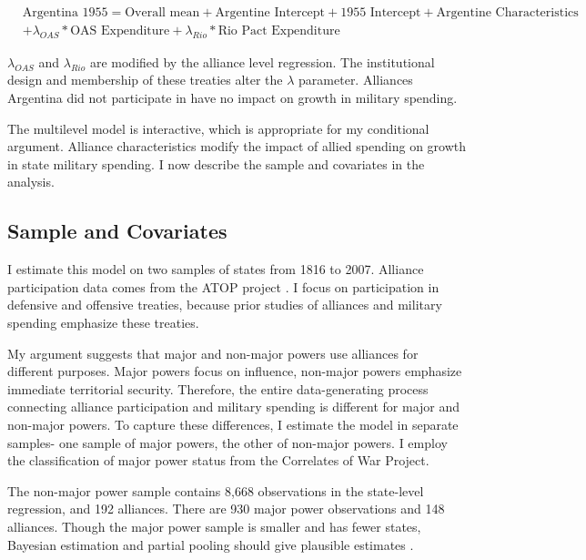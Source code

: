 \documentclass[12pt]{article}
\begin{document}
\begin{equation}
\begin{split}
& \mbox{Argentina 1955} = \mbox{Overall mean}
+ \mbox{Argentine Intercept} + \mbox{1955 Intercept} 
+ \mbox{Argentine Characteristics} \\
& + \lambda_{OAS} * \mbox{OAS Expenditure} + \lambda_{Rio} * \mbox{Rio Pact Expenditure}
\end{split} 
\end{equation}


$\lambda_{OAS}$ and $\lambda_{Rio}$ are modified by the alliance level regression. 
The institutional design and membership of these treaties alter the $\lambda$ parameter.
Alliances Argentina did not participate in have no impact on growth in military spending. 


The multilevel model is interactive, which is appropriate for my conditional argument. 
Alliance characteristics modify the impact of allied spending on growth in state military spending. 
I now describe the sample and covariates in the analysis.  



\subsection{Sample and Covariates} 

I estimate this model on two samples of states from 1816 to 2007. 
Alliance participation data comes from the ATOP project \citep{Leedsetal2002}. 
I focus on participation in defensive and offensive treaties, because prior studies of alliances and military spending emphasize these treaties. 


My argument suggests that major and non-major powers use alliances for different purposes.
Major powers focus on influence, non-major powers emphasize immediate territorial security.  
Therefore, the entire data-generating process connecting alliance participation and military spending is different for major and non-major powers. 
To capture these differences, I estimate the model in separate samples- one sample of major powers, the other of non-major powers.
I employ the classification of major power status from the Correlates of War Project. 


The non-major power sample contains 8,668 observations in the state-level regression, and 192 alliances. 
There are 930 major power observations and 148 alliances. 
Though the major power sample is smaller and has fewer states, Bayesian estimation and partial pooling should give plausible estimates \citep{Stegmueller2013}. 
\end{document}
